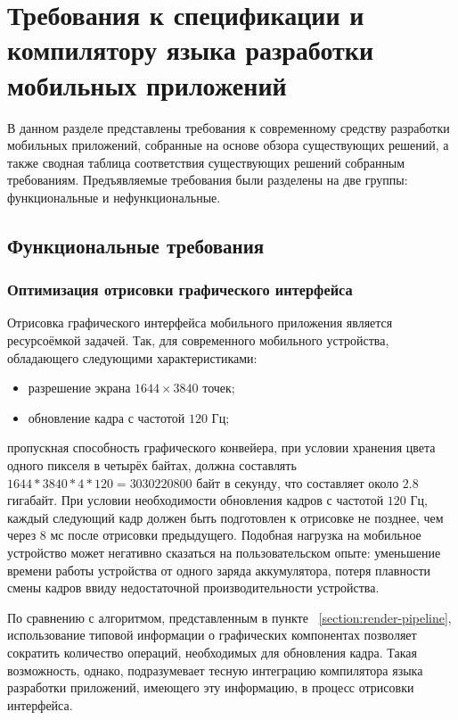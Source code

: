 \section{Требования к спецификации и компилятору языка разработки мобильных приложений}
\label{requirements-section}
В данном разделе представлены требования к современному средству
разработки мобильных приложений, собранные на основе обзора существующих
решений, а также сводная таблица соответствия существующих решений собранным
требованиям. Предъявляемые требования были разделены на две группы:
функциональные и нефункциональные.


\subsection{Функциональные требования}
\subsubsection*{Оптимизация отрисовки графического интерфейса}
Отрисовка графического интерфейса мобильного приложения является
ресурсоёмкой задачей. Так, для современного мобильного устройства,
обладающего следующими характеристиками:
\begin{itemize}
	\item разрешение экрана $1644 \times 3840$ точек;
	\item обновление кадра с частотой $120$ Гц;
\end{itemize}
пропускная способность графического конвейера, при условии хранения цвета
одного пикселя в четырёх байтах, должна составлять\\$1644 * 3840 * 4 * 120 = 3030220800$
байт в секунду, что составляет около $2.8$ гигабайт. При условии
необходимости обновления кадров с частотой $120$ Гц, каждый следующий кадр
должен быть подготовлен к отрисовке не позднее, чем через $8$ мс после
отрисовки предыдущего. Подобная нагрузка на мобильное устройство может
негативно сказаться на пользовательском опыте: уменьшение времени работы
устройства от одного заряда аккумулятора, потеря плавности смены кадров
ввиду недостаточной производительности устройства.

По сравнению с алгоритмом, представленным в пункте
~\ref{section:render-pipeline}, использование типовой информации о
графических компонентах позволяет сократить количество операций, необходимых
для обновления кадра. Такая возможность, однако, подразумевает
тесную интеграцию компилятора языка разработки приложений, имеющего
эту информацию, в процесс отрисовки интерфейса.


